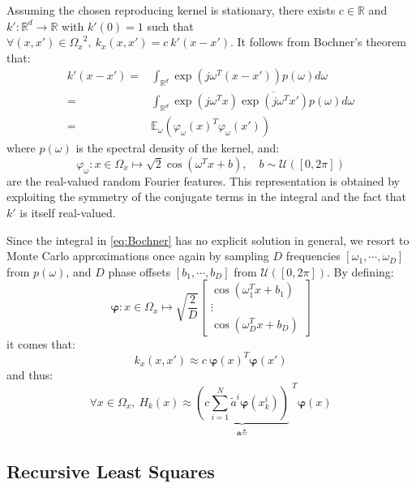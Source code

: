 \documentclass[conference]{IEEEtran}
\begin{document}
Assuming the chosen reproducing kernel is stationary, there exists $c\in\mathbb{R}$ and $k':\mathbb{R}^d\rightarrow\mathbb{R}$ with $k'(0)=1$ such that $\forall(x,x')\in{\Omega_x}^2,\:k_x(x,x')=c\: k'(x-x')$. It follows from Bochner's theorem that:
\begin{equation}
\begin{aligned}
k'(x-x')=&\int_{\mathbb{R}^d}{\exp(j\omega^T(x-x'))p(\omega)d\omega}\\
=&\int_{\mathbb{R}^d}{\exp(j\omega^Tx)\overline{\exp(j\omega^Tx')}p(\omega)d\omega}\\
=&\mathbb{E}_{\omega}(\varphi_{\omega}(x)^T\varphi_{\omega}(x'))
\end{aligned}\label{eq:Bochner}
\end{equation}
where $p(\omega)$ is the spectral density of the kernel, and:
\begin{equation}
\varphi_{\omega}:x\in\Omega_x\mapsto\sqrt{2}\cos(\omega^Tx+b),\quad b\sim\mathcal{U}([0,2\pi])
\end{equation}
are the real-valued random Fourier features. This representation is obtained by exploiting the symmetry of the conjugate terms in the integral and the fact that $k'$ is itself real-valued.

Since the integral in \eqref{eq:Bochner} has no explicit solution in general, we resort to Monte Carlo approximations once again by sampling $D$ frequencies $[\omega_1,\cdots,\omega_D]$ from $p(\omega)$, and $D$ phase offsets $[b_1,\cdots,b_D]$ from $\mathcal{U}([0,2\pi])$. By defining:
\begin{equation}
\boldsymbol{\varphi}:x\in\Omega_x\mapsto\sqrt{\frac{2}{D}}
\begin{bmatrix}
\cos(\omega_1^Tx+b_1)\\\vdots\\\cos(\omega_D^Tx+b_D)
\end{bmatrix}
\end{equation}
it comes that:
\begin{equation}
k_x(x,x')\approx c\:\boldsymbol{\varphi}(x)^T\boldsymbol{\varphi}(x')
\end{equation}
and thus:
\begin{equation}
\forall x\in\Omega_x,\:H_k(x)\approx{\underbrace{\left(c\sum_{i=1}^N\tilde{a}^i\boldsymbol{\varphi}(x_k^i)\right)}_{\textbf{a}\triangleq}\:}^T\boldsymbol{\varphi}(x)\label{eq:observation RFF}
\end{equation}

\subsection{Recursive Least Squares}
\end{document}
